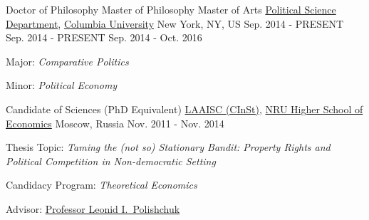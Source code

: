 

\begin{cventries}

\cventry
    {Doctor of Philosophy \newline Master of Philosophy \newline Master of Arts} %
    {\href{http://polisci.columbia.edu/}{Political Science Department}, \href{http://www.columbia.edu/}{Columbia University}} %
    {New York, NY, US} %
    {Sep. 2014 - PRESENT \newline Sep. 2014 - PRESENT \newline Sep. 2014 - Oct. 2016} %
    {
      \begin{cvitems} %
        \item {Major: \emph{Comparative Politics}}
        \item {Minor: \emph{Political Economy}}
      \end{cvitems}
    }

\cventry
    {Candidate of Sciences (PhD Equivalent)} %
    {\href{http://isc.hse.ru/about_eng}{LAAISC (CInSt)}, \href{http://www.hse.ru/en/}{NRU Higher School of Economics}} %
    {Moscow, Russia} %
    {Nov. 2011 - Nov. 2014} %
    {
      \begin{cvitems} %
        \item {Thesis Topic: \emph{Taming the (not so) Stationary Bandit: Property Rights and Political Competition in Non-democratic Setting}}
        \item {Candidacy Program: \emph{Theoretical Economics}}
        \item {Advisor: \href{http://www.hse.ru/en/org/persons/65104}{Professor Leonid I.~Polishchuk}}
      \end{cvitems}
    }


\end{cventries}

